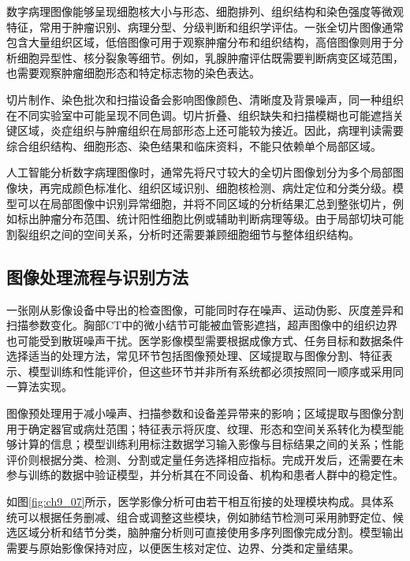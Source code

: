 数字病理图像能够呈现细胞核大小与形态、细胞排列、组织结构和染色强度等微观特征，常用于肿瘤识别、病理分型、分级判断和组织学评估。一张全切片图像通常包含大量组织区域，低倍图像可用于观察肿瘤分布和组织结构，高倍图像则用于分析细胞异型性、核分裂象等细节。例如，乳腺肿瘤评估既需要判断病变区域范围，也需要观察肿瘤细胞形态和特定标志物的染色表达。

切片制作、染色批次和扫描设备会影响图像颜色、清晰度及背景噪声，同一种组织在不同实验室中可能呈现不同色调。切片折叠、组织缺失和扫描模糊也可能遮挡关键区域，炎症组织与肿瘤组织在局部形态上还可能较为接近。因此，病理判读需要综合组织结构、细胞形态、染色结果和临床资料，不能只依赖单个局部区域。

人工智能分析数字病理图像时，通常先将尺寸较大的全切片图像划分为多个局部图像块，再完成颜色标准化、组织区域识别、细胞核检测、病灶定位和分类分级。模型可以在局部图像中识别异常细胞，并将不同区域的分析结果汇总到整张切片，例如标出肿瘤分布范围、统计阳性细胞比例或辅助判断病理等级。由于局部切块可能割裂组织之间的空间关系，分析时还需要兼顾细胞细节与整体组织结构。
\subsection{图像处理流程与识别方法}

一张刚从影像设备中导出的检查图像，可能同时存在噪声、运动伪影、灰度差异和扫描参数变化。胸部CT中的微小结节可能被血管影遮挡，超声图像中的组织边界也可能受到散斑噪声干扰。医学影像模型需要根据成像方式、任务目标和数据条件选择适当的处理方法，常见环节包括图像预处理、区域提取与图像分割、特征表示、模型训练和性能评价，但这些环节并非所有系统都必须按照同一顺序或采用同一算法实现。

图像预处理用于减小噪声、扫描参数和设备差异带来的影响；区域提取与图像分割用于确定器官或病灶范围；特征表示将灰度、纹理、形态和空间关系转化为模型能够计算的信息；模型训练利用标注数据学习输入影像与目标结果之间的关系；性能评价则根据分类、检测、分割或定量任务选择相应指标。完成开发后，还需要在未参与训练的数据中验证模型，并分析其在不同设备、机构和患者人群中的稳定性。

如图\ref{fig:ch9_07}所示，医学影像分析可由若干相互衔接的处理模块构成。具体系统可以根据任务删减、组合或调整这些模块，例如肺结节检测可采用肺野定位、候选区域分析和结节分类，脑肿瘤分析则可直接使用多序列图像完成分割。模型输出需要与原始影像保持对应，以便医生核对定位、边界、分类和定量结果。

\par
\noindent\begin{minipage}{\textwidth}
\centering
{}
\label{fig:ch9_07}
\end{minipage}
\par

